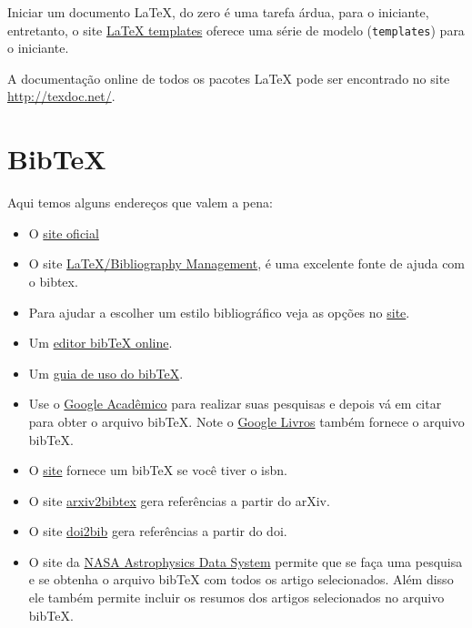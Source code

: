 \documentclass[portuguese,10pt,twocolumn]{article}
\begin{document}
Iniciar um documento \LaTeX{}, do zero é uma tarefa árdua, para o iniciante,
entretanto, o site \href{http://www.latextemplates.com/}{\LaTeX{} templates}
oferece uma série de modelo (\texttt{templates}) para o iniciante. 

A documentação online de todos os pacotes \LaTeX{} pode ser encontrado 
no site \url{http://texdoc.net/}.

\section{Bib\TeX}
Aqui temos alguns endereços que valem a pena:
\begin{itemize}
   \item O \href{http://www.bibtex.org/}{site oficial}
   \item O site 
   \href{https://en.wikibooks.org/wiki/LaTeX/Bibliography_Management}{LaTeX/Bibliography Management},
   é uma excelente fonte de ajuda com o bibtex.
   \item Para ajudar a escolher um estilo bibliográfico veja as opções no 
    \href{https://verbosus.com/bibtex-style-examples.html}{site}.
   \item Um \href{http://truben.no/latex/bibtex/}{editor bib\TeX{} online}.
   \item Um 
   \href{https://www.economics.utoronto.ca/osborne/latex/BIBTEX.HTM}{guia de uso do bib\TeX}.
   \item Use o \href{http://scholar.google.com.br}{Google Acadêmico} para
   realizar suas pesquisas e depois vá em citar para obter o arquivo bib\TeX{}.
   Note o \href{https://books.google.com/?hl=pt-PT}{Google Livros} também 
   fornece o arquivo bib\TeX{}.
   \item O \href{http://manas.tungare.name/software/isbn-to-bibtex/}{site} 
   fornece um bib\TeX{} se você tiver o isbn.
   \item O site \href{https://arxiv2bibtex.org/}{arxiv2bibtex} gera referências 
   a partir do arXiv.
   \item O site \href{http://www.doi2bib.org/#/doi}{doi2bib} gera referências a 
   partir do doi.
   \item O site da \href{http://adswww.harvard.edu/}{NASA Astrophysics Data System} 
   permite que se faça uma pesquisa e se obtenha o arquivo bib\TeX{} com
   todos os artigo selecionados. Além disso ele também permite incluir os resumos
   dos artigos selecionados no arquivo bib\TeX{}.
\end{itemize}
\end{document}
